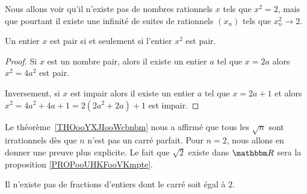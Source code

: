 Nous allons voir qu'il n'existe pas de nombres rationnels \( x\) tels que \( x^2=2\), mais que pourtant il existe une infinité de suites de rationnels \( (x_n)\) tels que \(  x_n^2\to 2  \).

\begin{lemma}       \label{LemJPIUooWFHaFM}
    Un entier \( x\) est pair si et seulement si l'entier \( x^2\) est pair.
\end{lemma}

\begin{proof}
    Si \( x\) est un nombre pair, alors il existe un entier \( a\) tel que \( x=2a\) alors \( x^2=4a^2\) est pair.

    Inversement, si \( x\) est impair alors il existe un entier \( a\) tel que \( x=2a+1\) et alors \( x^2=4a^2+4a+1=2(2a^2+2a)+1\) est impair.
\end{proof}

Le théorème~\ref{THOooYXJIooWcbnbm} nous a affirmé que tous les \( \sqrt{n}\) sont irrationnels dès que \( n\) n'est pas un carré parfait. Pour \( n=2\),  nous allons en donner une preuve plus explicite. Le fait que \( \sqrt{ 2 }\) existe dans \( \eR\) sera la proposition \ref{PROPooUHKFooVKmpte}.
\begin{proposition}     \label{PropooRJMSooPrdeJb}
    Il n'existe pas de fractions d'entiers dont le carré soit égal à \( 2\).
\end{proposition}

